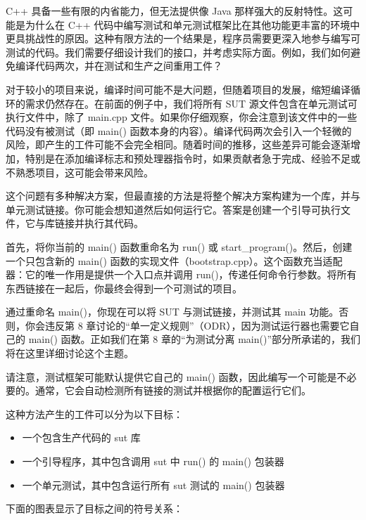 C++ 具备一些有限的内省能力，但无法提供像 Java 那样强大的反射特性。这可能是为什么在 C++ 代码中编写测试和单元测试框架比在其他功能更丰富的环境中更具挑战性的原因。这种有限方法的一个结果是，程序员需要更深入地参与编写可测试的代码。我们需要仔细设计我们的接口，并考虑实际方面。例如，我们如何避免编译代码两次，并在测试和生产之间重用工件？

对于较小的项目来说，编译时间可能不是大问题，但随着项目的发展，缩短编译循环的需求仍然存在。在前面的例子中，我们将所有 SUT 源文件包含在单元测试可执行文件中，除了 main.cpp 文件。如果你仔细观察，你会注意到该文件中的一些代码没有被测试（即 main() 函数本身的内容）。编译代码两次会引入一个轻微的风险，即产生的工件可能不会完全相同。随着时间的推移，这些差异可能会逐渐增加，特别是在添加编译标志和预处理器指令时，如果贡献者急于完成、经验不足或不熟悉项目，这可能会带来风险。

这个问题有多种解决方案，但最直接的方法是将整个解决方案构建为一个库，并与单元测试链接。你可能会想知道然后如何运行它。答案是创建一个引导可执行文件，它与库链接并执行其代码。

首先，将你当前的 main() 函数重命名为 run() 或 start\_program()。然后，创建一个只包含新的 main() 函数的实现文件（bootstrap.cpp）。这个函数充当适配器：它的唯一作用是提供一个入口点并调用 run()，传递任何命令行参数。将所有东西链接在一起后，你最终会得到一个可测试的项目。

通过重命名 main()，你现在可以将 SUT 与测试链接，并测试其 main 功能。否则，你会违反第 8 章讨论的“单一定义规则”（ODR），因为测试运行器也需要它自己的 main() 函数。正如我们在第 8 章的“为测试分离 main()”部分所承诺的，我们将在这里详细讨论这个主题。

请注意，测试框架可能默认提供它自己的 main() 函数，因此编写一个可能是不必要的。通常，它会自动检测所有链接的测试并根据你的配置运行它们。

这种方法产生的工件可以分为以下目标：

\begin{itemize}
\item
一个包含生产代码的 sut 库

\item
一个引导程序，其中包含调用 sut 中 run() 的 main() 包装器

\item
一个单元测试，其中包含运行所有 sut 测试的 main() 包装器
\end{itemize}

下面的图表显示了目标之间的符号关系：


